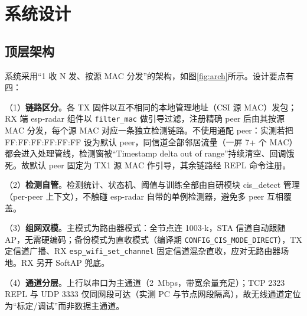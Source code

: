 \chapter{系统设计}\label{chap:design}

\section{顶层架构}\label{sec:arch}

系统采用“1 收 N 发、按源 MAC 分发”的架构，如图\ref{fig:arch}所示。设计要点有四：

（1）\textbf{链路区分}。各 TX 固件以互不相同的本地管理地址（CSI 源 MAC）发包；RX 端 esp-radar 组件以 \texttt{filter\_mac} 做引导过滤，注册精确 peer 后由其按源 MAC 分发，每个源 MAC 对应一条独立检测链路。不使用通配 peer：实测若把 FF:FF:FF:FF:FF:FF 设为默认 peer，同信道全部邻居流量（一屏 7+ 个 MAC）都会进入处理管线，检测窗被``Timestamp delta out of range''持续清空、回调饿死。故默认 peer 固定为 TX1 源 MAC 作引导，其余链路经 REPL 命令注册。

（2）\textbf{检测自管}。检测统计、状态机、阈值与训练全部由自研模块 cis\_detect 管理（per-peer 上下文），不触碰 esp-radar 自带的单例检测器，避免多 peer 互相覆盖。

（3）\textbf{组网双模}。主模式为路由器模式：全节点连 1003-k，STA 信道自动跟随 AP，无需硬编码；备份模式为直收模式（编译期 \texttt{CONFIG\_CIS\_MODE\_DIRECT}），TX 定信道广播、RX \texttt{esp\_wifi\_set\_channel} 固定信道混杂直收，应对无路由器场地。RX 另开 SoftAP 兜底。

（4）\textbf{通道分层}。上行以串口为主通道（2~Mbps，带宽余量充足）；TCP 2323 REPL 与 UDP 3333 仅同网段可达（实测 PC 与节点网段隔离），故无线通道定位为“标定/调试”而非数据主通道。


